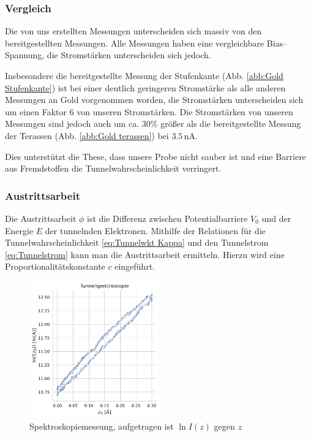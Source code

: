 \documentclass[12pt,a4paper]{scrartcl}
\numberwithin{equation}{section} %
\begin{document}
\newpage
\hypertarget{vergleich}{%
\subsubsection{Vergleich}\label{vergleich}}

Die von uns erstellten Messungen unterscheiden sich massiv von den bereitgestellten Messungen. Alle Messungen haben eine vergleichbare Bias--Spannung, die Stromstärken unterscheiden sich jedoch.

Insbesondere die bereitgestellte Messung der Stufenkante (Abb. \ref{abb:Gold Stufenkante}) ist bei einer deutlich geringeren Stromstärke als alle anderen Messungen an Gold vorgenommen worden, die Stromstärken unterscheiden sich um einen Faktor $6$ von unseren Stromstärken. Die Stromstärken von unseren Messungen sind jedoch auch um ca. $30\%$ größer als die bereitgestellte Messung der Terassen (Abb. \ref{abb:Gold terassen}) bei $3.5 \mathrm{\,nA}$.

Dies unterstützt die These, dass unsere Probe nicht sauber ist und eine Barriere aus Fremdstoffen die Tunnelwahrscheinlichkeit verringert.

\hypertarget{austrittsarbeit-1}{%
\subsubsection{Austrittsarbeit}\label{austrittsarbeit-1}}

Die Austrittsarbeit $\phi$ ist die Differenz zwischen Potentialbarriere $V_0$ und der Energie $E$ der tunnelnden Elektronen. Mithilfe der Relationen für die Tunnelwahrscheinlichkeit \eqref{eq:Tunnelwkt Kappa} und den Tunnelstrom \eqref{eq:Tunnelstrom} kann man die Austrittsarbeit ermitteln. Hierzu wird eine Proportionalitätskonstante $c$ eingeführt.

\begin{figure}[ht]
	\centering
	\includegraphics[width=0.5\textwidth]{../media/B2.5/Spektroskopie_2.pdf}
	\caption{Spektroskopiemessung, aufgetragen ist $\ln{I(z)}$ gegen $z$}
	\label{abb:Spektroskopie}
\end{figure}
\end{document}
